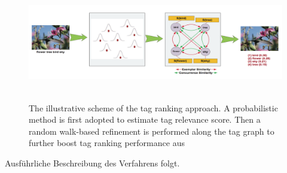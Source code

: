 \begin{figure}[htbp]
  \centering
    \includegraphics[height=2in]{images/tag_ranking_verfahren.png}
  \caption{The illustrative scheme of the tag ranking approach. A probabilistic method is first adopted to estimate tag relevance score. Then a random walk-based refinement is performed along the tag graph to further boost tag ranking performance aus \cite{ranking}}
  \label{fig:images_tag_ranking_verfahren}
\end{figure}


Ausführliche Beschreibung des Verfahrens folgt.

